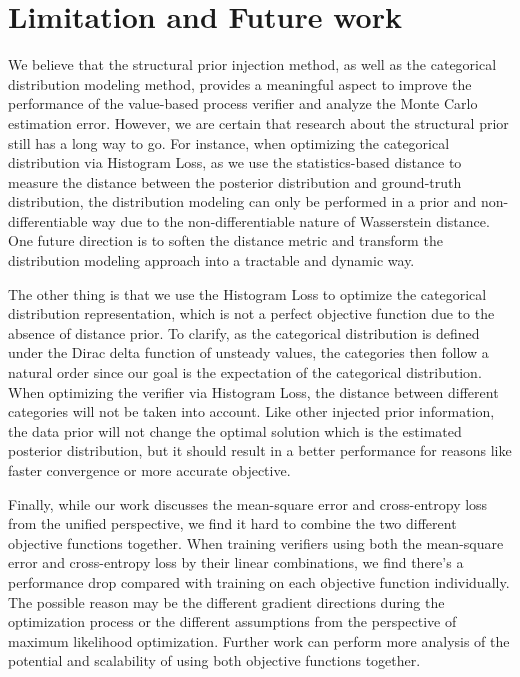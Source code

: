 \section{Limitation and Future work}
We believe that the structural prior injection method, as well as the categorical distribution modeling method, provides a meaningful aspect to improve the performance of the value-based process verifier and analyze the Monte Carlo estimation error. However, we are certain that research about the structural prior still has a long way to go. For instance, when optimizing the categorical distribution via Histogram Loss, as we use the statistics-based distance to measure the distance between the posterior distribution and ground-truth distribution, the distribution modeling can only be performed in a prior and non-differentiable way due to the non-differentiable nature of Wasserstein distance. One future direction is to soften the distance metric and transform the distribution modeling approach into a tractable and dynamic way. 

The other thing is that we use the Histogram Loss to optimize the categorical distribution representation, which is not a perfect objective function due to the absence of distance prior. To clarify, as the categorical distribution is defined under the Dirac delta function of unsteady values, the categories then follow a natural order since our goal is the expectation of the categorical distribution. When optimizing the verifier via Histogram Loss, the distance between different categories will not be taken into account. Like other injected prior information, the data prior will not change the optimal solution which is the estimated posterior distribution, but it should result in a better performance for reasons like faster convergence or more accurate objective.

Finally, while our work discusses the mean-square error and cross-entropy loss from the unified perspective, we find it hard to combine the two different objective functions together. When training verifiers using both the mean-square error and cross-entropy loss by their linear combinations, we find there's a performance drop compared with training on each objective function individually. The possible reason may be the different gradient directions during the optimization process or the different assumptions from the perspective of maximum likelihood optimization. Further work can perform more analysis of the potential and scalability of using both objective functions together.
